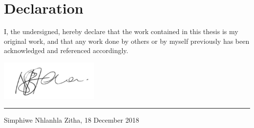 \vfill
\newpage
\section*{Declaration}
I, the undersigned, hereby declare that the work contained in this thesis is my original work, and that any work done by others or by myself previously has been acknowledged and referenced accordingly.

\includegraphics[height=2cm]{images/Signature.png} \newline \hrule
Simphiwe Nhlanhla Zitha,  18 December 2018

